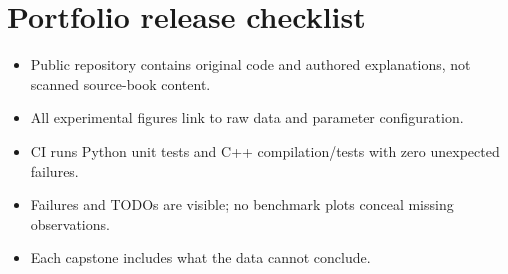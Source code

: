 \documentclass[11pt,letterpaper]{article}
\begin{document}
\section{Portfolio release checklist}
\begin{itemize}
\item Public repository contains original code and authored explanations, not scanned source-book content.
\item All experimental figures link to raw data and parameter configuration.
\item CI runs Python unit tests and C++ compilation/tests with zero unexpected failures.
\item Failures and TODOs are visible; no benchmark plots conceal missing observations.
\item Each capstone includes what the data cannot conclude.
\end{itemize}
\end{document}
